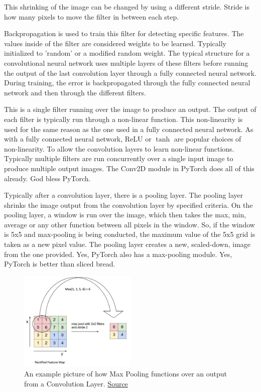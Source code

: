 This shrinking of the image can be changed by using a different stride.
Stride is how many pixels to move the filter in between each step.

Backpropagation is used to train this filter for detecting specific features. The values inside of the filter are considered weights to be learned. Typically initialized to 'random' or a modified random weight.
The typical structure for a convolutional neural network uses multiple layers of these filters before running the output of the last convolution layer through a fully connected neural network. During training, the error is backpropagated through the fully connected neural network and then through the different filters.

This is a single filter running over the image to produce an output.
The output of each filter is typically run through a non-linear function.
This non-linearity is used for the same reason as the one used in a fully connected neural network. As with a fully connected neural network, ReLU or $\tanh$ are popular choices of non-linearity. To allow the convolution layers to learn non-linear functions. Typically multiple filters are run concurrently over a single input image to produce multiple output images. The Conv2D module in PyTorch does all of this already. God bless PyTorch.

Typically after a convolution layer, there is a pooling layer.
The pooling layer shrinks the image output from the convolution layer by specified criteria. On the pooling layer, a window is run over the image, which then takes the max, min, average or any other function between all pixels in the window. So, if the window is 5x5 and max-pooling is being conducted, the maximum value of the 5x5 grid is taken as a new pixel value. The pooling layer creates a new, scaled-down, image from the one provided. Yes, PyTorch also has a max-pooling module. Yes, PyTorch is better than sliced bread.

\begin{figure}[ht]
  \centering
      \includegraphics[width=0.5\textwidth]{figs/MaxPooling.png}
          \caption{
            An example picture of how Max Pooling functions over an output from a Convolution Layer.
            \href{https://ulkarn.me/2016/08/11/intuitive-explanation-convnets/}{Source}
          }
\end{figure}

